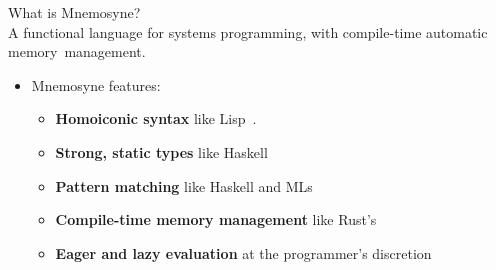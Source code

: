 \documentclass{beamer}
\begin{document}
\begin{frame}
\alert{\huge{What is Mnemosyne?}}\\
\large{\alert{A functional language} for systems programming, with compile-time automatic memory~management.} \normalsize
\begin{itemize}
\item Mnemosyne features:
\begin{itemize}
\item\textbf{Homoiconic syntax} like Lisp~\cite{vanderhart2010macros,sicp}.
\item\textbf{Strong, static types} like Haskell~\cite{jones2003haskell,hudak1992gentle,hudak1992report}
\item\textbf{Pattern matching} like Haskell and MLs~\cite{jones2003haskell,maranget2007warnings,Krishnaswami:2009:FPM:1594834.1480927,hudak1992report,odersky2004scala}
\item\textbf{Compile-time memory management} like Rust's~\cite{whyrust,whyrust}
\item\textbf{Eager and lazy evaluation} at the programmer's discretion
\end{itemize}
\end{itemize}
%

\end{frame}
\end{document}
